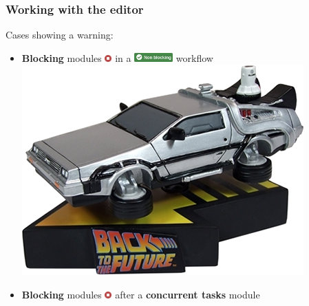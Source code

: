 \begin{frame}
    \frametitle{Working with the editor}
    Cases showing a warning:
    \begin{itemize}
        \item \textbf{Blocking} modules \includegraphics[width=10px]{pictures/blocking-module.png} in a \includegraphics[valign=b,width=56px]{pictures/non-blocking-workflow.png} workflow \includegraphics[width=0.12\linewidth]{pictures/time-machine.png}
        \item \textbf{Blocking} modules \includegraphics[width=10px]{pictures/blocking-module.png} after a \textbf{concurrent tasks} module
        \begin{center}
        \end{center}
    \end{itemize}
\end{frame}

